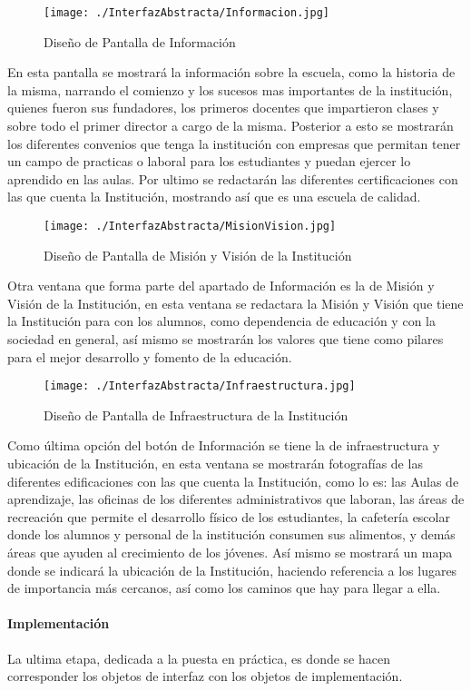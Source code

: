 \begin{figure}[H]
\centering
	\texttt{[image: ./InterfazAbstracta/Informacion.jpg]}
	\caption{Diseño de Pantalla de Información}	
\end{figure}

{\large En esta pantalla se mostrará la información sobre la escuela, como la historia de la misma, narrando el comienzo y los sucesos mas importantes de la institución, quienes fueron sus fundadores, los primeros docentes que impartieron clases y sobre todo el primer director a cargo de la misma.
Posterior a esto se mostrarán los diferentes convenios que tenga la institución con empresas que permitan tener un campo de practicas o laboral para los estudiantes y puedan ejercer lo aprendido en las aulas.
Por ultimo se redactarán las diferentes certificaciones con las que cuenta la Institución, mostrando así que es una escuela de calidad.}\\

\begin{figure}[H]
\centering
	\texttt{[image: ./InterfazAbstracta/MisionVision.jpg]}
	\caption{Diseño de Pantalla de Misión y Visión de la Institución}	
\end{figure}

{\large Otra ventana que forma parte del apartado de Información es la de Misión y Visión de la Institución, en esta ventana se redactara la Misión y Visión que tiene la Institución para con los alumnos, como dependencia de educación y con la sociedad en general, así mismo se mostrarán los valores que tiene como pilares para el mejor desarrollo y fomento de la educación.}\\

\begin{figure}[H]
\centering
	\texttt{[image: ./InterfazAbstracta/Infraestructura.jpg]}
	\caption{Diseño de Pantalla de Infraestructura de la Institución}	
\end{figure}

{\large Como última opción del botón de Información se tiene la de infraestructura y ubicación de la Institución, en esta ventana se mostrarán fotografías de las diferentes edificaciones con las que cuenta la Institución, como lo es: las Aulas de aprendizaje, las oficinas de los diferentes administrativos que laboran, las áreas de recreación que permite el desarrollo físico de los estudiantes, la cafetería escolar donde los alumnos y personal de la institución consumen sus alimentos, y demás áreas que ayuden al crecimiento de los jóvenes. 
Así mismo se mostrará un mapa donde se indicará la ubicación de la Institución, haciendo referencia a los lugares de importancia más cercanos, así como los caminos que hay para llegar a ella.}\\

\paragraph{Implementación}

{\large La ultima etapa, dedicada a la puesta en práctica, es donde se hacen corresponder los objetos de interfaz con los objetos de implementación.}\\


